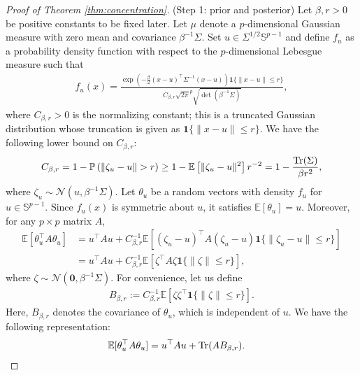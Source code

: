 \documentclass[11pt,a4paper]{article}
\theoremstyle{remark}
\theoremstyle{definition}
\newcommand{\bu}{u}
\newcommand{\bx}{x}
\newcommand{\bzeta}{\zeta}
\newcommand{\btheta}{\theta}
\newcommand{\bfA}{A}
\newcommand{\bfB}{B}
\newcommand{\bSigma}{\Sigma}
\newcommand{\bbS}{\mathbb{S}}
\newcommand{\E}{\mathbb{E}}
\renewcommand{\Pr}{\mathbb{P}}
\newcommand{\Gauss}{\mathcal{N}}
\newcommand{\tr}{\textnormal{Tr}}
\newcommand{\zero}{\mathbf{0}}
\theoremstyle{definition}
\renewcommand{\Pr}{\mathbb{P}}
\begin{document}
\begin{bibunit}[apalike]
\begin{proof}[Proof of Theorem \ref{thm:concentration}]
    (Step 1: prior and posterior)
    Let $\beta,r>0$ be positive constants to be fixed later. 
    Let $\mu$ denote a $p$-dimensional Gaussian measure with zero mean and covariance $\beta^{-1}\bSigma$.
    Set $\bu\in\bSigma^{1/2}\bbS^{p-1}$ and define $f_{\bu}$ as a probability density function with respect to the $p$-dimensional Lebesgue measure such that
    \begin{align*}
        f_{\bu}(\bx)=\frac{\exp\left(-\frac{\beta}{2}(\bx-\bu)^{\top}\bSigma^{-1}(\bx-\bu)\right)\mathbf{1}\{\|\bx-\bu\|\le r\}}{C_{\beta,r}\sqrt{2\pi}^{p}\sqrt{\det(\beta^{-1}\bSigma)}},
    \end{align*}
    where $C_{\beta,r}>0$ is the normalizing constant; this is a truncated Gaussian distribution whose truncation is given as $\mathbf{1}\{\|\bx-\bu\|\le r\}$.
    We have the following lower bound on $C_{\beta,r}$:
    \begin{equation*}
        C_{\beta,r}=1-\Pr\left(\|\bzeta_{\bu}-\bu\|>r\right)\ge 1-\E\left[\|\bzeta_{\bu}-\bu\|^{2}\right]r^{-2}=1-\frac{\tr(\bSigma)}{\beta r^{2}},
    \end{equation*}
    where $\bzeta_{u}\sim\Gauss(\bu,\beta^{-1}\bSigma)$.
    Let $\btheta_{\bu}$ be a random vectors with density $f_{\bu}$ for $\bu\in\bbS^{p-1}$.
    Since $f_{\bu}(\bx)$ is symmetric about $\bu$, it satisfies $\E[\btheta_{\bu}]=\bu$.
    Moreover, for any $p\times p$ matrix $\bfA$,
    \begin{align*}
        \E[\btheta_{\bu}^{\top}\bfA\btheta_{\bu}]&=\bu^{\top}\bfA\bu+C_{\beta,r}^{-1}\E[(\bzeta_{\bu}-\bu)^{\top}\bfA(\bzeta_{\bu}-\bu)\mathbf{1}\{\|\bzeta_{\bu}-\bu\|\le r\}]\\
        &= \bu^{\top}\bfA\bu+C_{\beta,r}^{-1}\E[\bzeta^{\top}\bfA\bzeta\mathbf{1}\{\|\bzeta\|\le r\}],
    \end{align*}
    where $\zeta\sim \Gauss(\zero,\beta^{-1}\bSigma)$.
    For convenience, let us define
    \begin{align*}
        \bfB_{\beta,r}:=C_{\beta,r}^{-1}\E[\bzeta\bzeta^{\top}\mathbf{1}\{\|\bzeta\|\le r\}].
    \end{align*}
    Here, $\bfB_{\beta,r}$ denotes the covariance of $\btheta_{\bu}$, which is independent of $\bu$.
    We have the following representation:
    \begin{align}
        \E[\btheta_{\bu}^{\top}\bfA\btheta_{\bu}]&= \bu^{\top}\bfA\bu+\tr(\bfA\bfB_{\beta,r})\label{eq:posteriormean:1}.
    \end{align}
    

\end{proof}
\end{bibunit}
\end{document}
